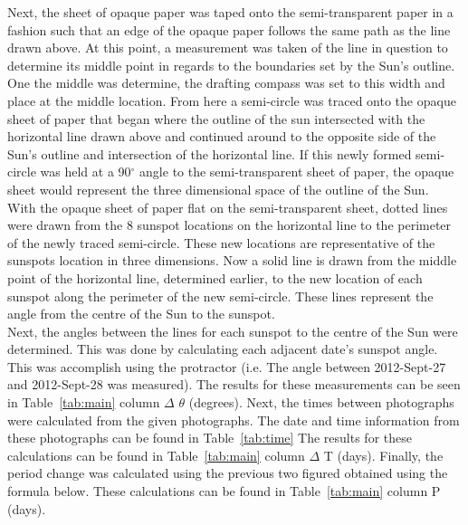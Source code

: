 \documentclass{article}
\begin{document}
Next, the sheet of opaque paper was taped onto the semi-transparent paper in a fashion such that an edge of the opaque
paper follows the same path as the line drawn above. At this point, a measurement was taken of the line in question to 
determine its middle point in regards to the boundaries set by the Sun's outline. One the middle was determine, the 
drafting compass was set to this width and place at the middle location. From here a semi-circle was traced onto the 
opaque sheet of paper that began where the outline of the sun intersected with the horizontal line drawn above and
continued around to the opposite side of the Sun's outline and intersection of the horizontal line. If this newly formed
semi-circle was held at a 90$^\circ$ angle to the semi-transparent sheet of paper, the opaque sheet would represent
the three dimensional space of the outline of the Sun.\\

With the opaque sheet of paper flat on the semi-transparent sheet, dotted lines were drawn from the 8 sunspot locations
on the horizontal line to the perimeter of the newly traced semi-circle. These new locations are representative of the 
sunspots location in three dimensions. Now a solid line is drawn from the middle point of the horizontal line, determined
earlier, to the new location of each sunspot along the perimeter of the new semi-circle. These lines represent the angle
from the centre of the Sun to the sunspot.\\

Next, the angles between the lines for each sunspot to the centre of the Sun were determined. This was done by calculating
each adjacent date's sunspot angle. This was accomplish using the protractor (i.e. The angle between 2012-Sept-27 and 
2012-Sept-28 was measured). The results for these measurements can be seen in Table~\ref{tab:main} column 
$\Delta$ $\theta$ (degrees). Next, the times between photographs were calculated from the given photographs. The date
and time information from these photographs can be found in Table~\ref{tab:time} The results
for these calculations can be found in Table~\ref{tab:main} column $\Delta$ T (days). Finally, the period change was calculated
using the previous two figured obtained using the formula below. These calculations can be found in Table~\ref{tab:main} column 
P (days).\\

\end{document}
